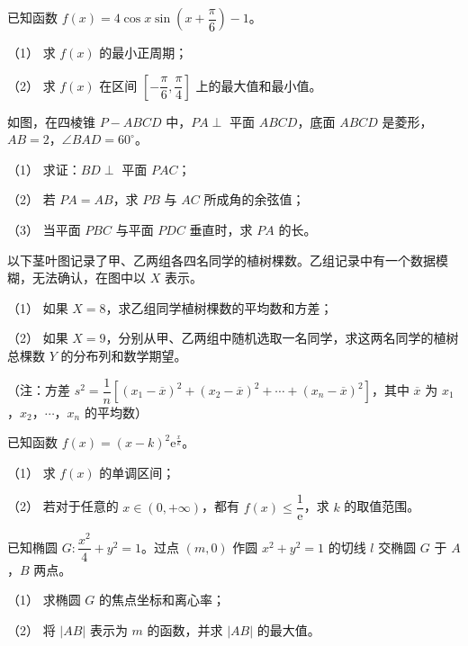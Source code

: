 \begin{question}
已知函数 $f(x)=4\cos x\sin\left(x+\dfrac{\pi}{6}\right)-1$。

（1） 求 $f(x)$ 的最小正周期；

（2） 求 $f(x)$ 在区间 $\left[-\dfrac{\pi}{6},\dfrac{\pi}{4}\right]$ 上的最大值和最小值。

\Needspace{0.4\textheight}
\end{question}
\begin{question}
如图，在四棱锥 $P-ABCD$ 中，$PA\perp$ 平面 $ABCD$，底面 $ABCD$ 是菱形，$AB=2$，$\angle BAD=60^\circ$。

（1） 求证：$BD\perp$ 平面 $PAC$；

（2） 若 $PA=AB$，求 $PB$ 与 $AC$ 所成角的余弦值；

（3） 当平面 $PBC$ 与平面 $PDC$ 垂直时，求 $PA$ 的长。
\nopagebreak[4]
\begin{center}\end{center}
\nopagebreak[4]
\Needspace{0.4\textheight}
\end{question}
\begin{question}
以下茎叶图记录了甲、乙两组各四名同学的植树棵数。乙组记录中有一个数据模糊，无法确认，在图中以 $X$ 表示。
\nopagebreak[4]
\begin{center}\end{center}
\nopagebreak[4]
（1） 如果 $X=8$，求乙组同学植树棵数的平均数和方差；

（2） 如果 $X=9$，分别从甲、乙两组中随机选取一名同学，求这两名同学的植树总棵数 $Y$ 的分布列和数学期望。

（注：方差 $s^2=\dfrac1n\left[(x_1-\overline x)^2+(x_2-\overline x)^2+\cdots+(x_n-\overline x)^2\right]$，其中 $\overline x$ 为 $x_1$，$x_2$，$\cdots$，$x_n$ 的平均数）

\end{question}
\begin{question}
已知函数 $f(x)=(x-k)^2\mathrm{e}^{\frac xk}$。

（1） 求 $f(x)$ 的单调区间；

（2） 若对于任意的 $x\in(0,+\infty)$，都有 $f(x)\leqslant\dfrac1{\mathrm{e}}$，求 $k$ 的取值范围。

\end{question}
\begin{question}
已知椭圆 $G:\dfrac{x^2}{4}+y^2=1$。过点 $(m,0)$ 作圆 $x^2+y^2=1$ 的切线 $l$ 交椭圆 $G$ 于 $A$，$B$ 两点。

（1） 求椭圆 $G$ 的焦点坐标和离心率；

（2） 将 $|AB|$ 表示为 $m$ 的函数，并求 $|AB|$ 的最大值。

\end{question}
